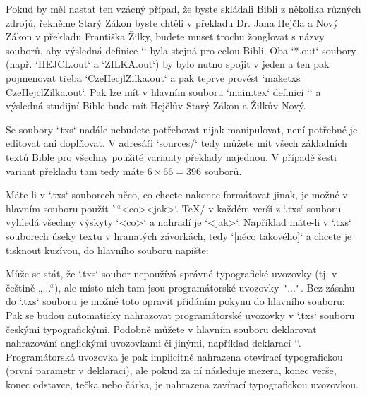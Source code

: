 Pokud by měl nastat ten vzácný případ, že byste skládali Bibli z několika různých zdrojů, řekněme Starý Zákon byste chtěli v překladu Dr. Jana Hejčla a Nový Zákon v překladu Františka Žilky, budete muset trochu žonglovat s názvy souborů, aby výsledná definice `\tmark` byla stejná pro celou Bibli. Oba `*.out` soubory (např. `HEJCL.out` a `ZILKA.out`) by bylo nutno spojit v jeden a ten pak pojmenovat třeba `CzeHecjlZilka.out` a pak teprve provést 
`maketxs CzeHejclZilka.out`.  Pak lze mít v hlavním souboru `main.tex` definici    `\def\tmark{HejclZilka}` a 
výsledná studijní Bible bude mít Hejčlův Starý Zákon a Žilkův Nový.








Se soubory `.txs` nadále nebudete
potřebovat nijak manipulovat, není potřebné je editovat ani doplňovat. V
adresáři `sources/` tedy můžete mít  všech základních textů
Bible pro všechny použité varianty překlady najednou. V případě šesti variant
překladu tam tedy máte $6\times66=396$ souborů.

Máte-li v `.txs` souborech něco, co chcete nakonec formátovat jinak, je možné
v hlavním souboru použít \`\cnvtext``{<co>}{<jak>}`. \TeX/ v každém verši z
`.txs` souboru vyhledá všechny výskyty `<co>` a nahradí je `<jak>`.
Například máte-li v `.txs` souborech úseky textu v hranatých závorkách, tedy
`[něco takového]` a chcete je tisknout kuzívou, do hlavního souboru napište:
\begtt
\cnvtext{[}{\bgroup\it}  \cnvtext{]}{\/\egroup}
\endtt

Může se stát, že `.txs` soubor nepoužívá správné typografické uvozovky (tj. v
češtině „...“), ale místo nich tam jsou programátorské uvozovky {\tt"}...{\tt"}. 
Bez zásahu do `.txs` souboru je možné toto opravit přidáním pokynu do
hlavního souboru:
\begtt
{}
\endtt
Pak se budou automaticky nahrazovat programátorské uvozovky v `.txs` souboru českými
typografickými. Podobně můžete v hlavním souboru deklarovat nahrazování
anglickými uvozovkami či jinými, například deklarací
``.
Programátorská uvozovka je pak implicitně
nahrazena otevírací typografickou (první parametr v deklaraci), ale pokud za
ní následuje mezera, konec verše, konec odstavce, tečka nebo čárka, je
nahrazena zavírací typografickou uvozovkou.

